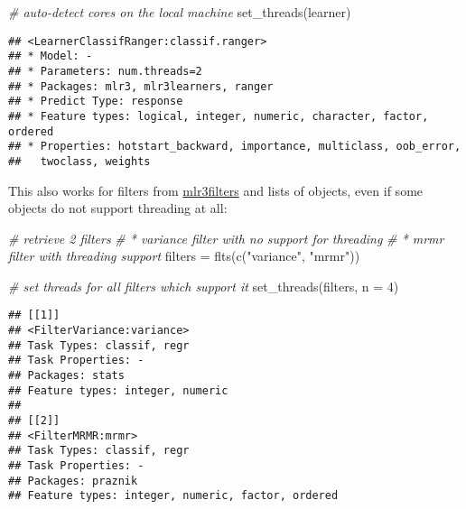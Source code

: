 \documentclass[
]{scrbook}
\newenvironment{Shaded}{\begin{snugshade}}{\end{snugshade}}
\newcommand{\AttributeTok}[1]{\textcolor[rgb]{0.77,0.63,0.00}{#1}}
\newcommand{\CommentTok}[1]{\textcolor[rgb]{0.56,0.35,0.01}{\textit{#1}}}
\newcommand{\DecValTok}[1]{\textcolor[rgb]{0.00,0.00,0.81}{#1}}
\newcommand{\FunctionTok}[1]{\textcolor[rgb]{0.00,0.00,0.00}{#1}}
\newcommand{\NormalTok}[1]{#1}
\newcommand{\OtherTok}[1]{\textcolor[rgb]{0.56,0.35,0.01}{#1}}
\newcommand{\SpecialCharTok}[1]{\textcolor[rgb]{0.00,0.00,0.00}{#1}}
\newcommand{\StringTok}[1]{\textcolor[rgb]{0.31,0.60,0.02}{#1}}
\renewenvironment{Shaded} {\begin{snugshade}\small} {\end{snugshade}}
\begin{document}
\begin{Shaded}
\begin{Highlighting}[]
\CommentTok{\# auto{-}detect cores on the local machine}
\FunctionTok{set\_threads}\NormalTok{(learner)}
\end{Highlighting}
\end{Shaded}

\begin{verbatim}
## <LearnerClassifRanger:classif.ranger>
## * Model: -
## * Parameters: num.threads=2
## * Packages: mlr3, mlr3learners, ranger
## * Predict Type: response
## * Feature types: logical, integer, numeric, character, factor, ordered
## * Properties: hotstart_backward, importance, multiclass, oob_error,
##   twoclass, weights
\end{verbatim}

This also works for filters from \href{https://mlr3filters.mlr-org.com}{mlr3filters} and lists of objects, even if some objects do not support threading at all:

\begin{Shaded}
\begin{Highlighting}[]
\CommentTok{\# retrieve 2 filters}
\CommentTok{\# * variance filter with no support for threading}
\CommentTok{\# * mrmr filter with threading support}
\NormalTok{filters }\OtherTok{=} \FunctionTok{flts}\NormalTok{(}\FunctionTok{c}\NormalTok{(}\StringTok{"variance"}\NormalTok{, }\StringTok{"mrmr"}\NormalTok{))}

\CommentTok{\# set threads for all filters which support it}
\FunctionTok{set\_threads}\NormalTok{(filters, }\AttributeTok{n =} \DecValTok{4}\NormalTok{)}
\end{Highlighting}
\end{Shaded}

\begin{verbatim}
## [[1]]
## <FilterVariance:variance>
## Task Types: classif, regr
## Task Properties: -
## Packages: stats
## Feature types: integer, numeric
## 
## [[2]]
## <FilterMRMR:mrmr>
## Task Types: classif, regr
## Task Properties: -
## Packages: praznik
## Feature types: integer, numeric, factor, ordered
\end{verbatim}

\begin{Shaded}
\end{Shaded}
\end{document}
